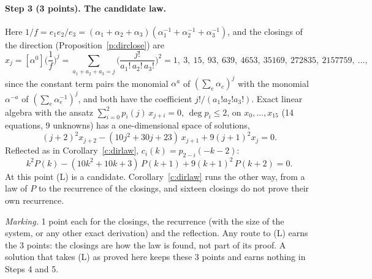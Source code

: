 \documentclass[11pt]{article}
\theoremstyle{plain}
\theoremstyle{definition}
\theoremstyle{remark}
\begin{document}
\paragraph{Step 3 (3 points). The candidate law.}
Here $1/f=e_1e_2/e_3=(\alpha_1+\alpha_2+\alpha_3)(\alpha_1^{-1}+\alpha_2^{-1}+\alpha_3^{-1})$, and the closings of the direction (Proposition~\ref{p:dirclose}) are
\[
x_j=[\alpha^0]\Big(\frac1f\Big)^j=\sum_{a_1+a_2+a_3=j}\Big(\frac{j!}{a_1!\,a_2!\,a_3!}\Big)^2=1,\ 3,\ 15,\ 93,\ 639,\ 4653,\ 35169,\ 272835,\ 2157759,\ \dots,
\]
since the constant term pairs the monomial $\alpha^a$ of $(\sum_e\alpha_e)^j$ with the monomial $\alpha^{-a}$ of $(\sum_e\alpha_e^{-1})^j$, and both have the coefficient $j!/(a_1!a_2!a_3!)$. Exact linear algebra with the ansatz $\sum_{i=0}^2p_i(j)\,x_{j+i}=0$, $\deg p_i\le2$, on $x_0,\dots,x_{15}$ (14 equations, 9 unknowns) has a one-dimensional space of solutions,
\[
(j+2)^2x_{j+2}-(10j^2+30j+23)\,x_{j+1}+9(j+1)^2x_j=0 .
\]
Reflected as in Corollary~\ref{c:dirlaw}, $c_i(k)=p_{2-i}(-k-2)$:
\begin{equation}\tag{L}
k^2P(k)-(10k^2+10k+3)\,P(k+1)+9(k+1)^2\,P(k+2)=0 .
\end{equation}
At this point (L) is a candidate. Corollary~\ref{c:dirlaw} runs the other way, from a law of $P$ to the recurrence of the closings, and sixteen closings do not prove their own recurrence.

\smallskip\noindent\emph{Marking.} 1 point each for the closings, the recurrence (with the size of the system, or any other exact derivation) and the reflection. Any route to (L) earns the 3 points: the closings are how the law is found, not part of its proof. A solution that takes (L) as proved here keeps these 3 points and earns nothing in Steps 4 and 5.
\end{document}
